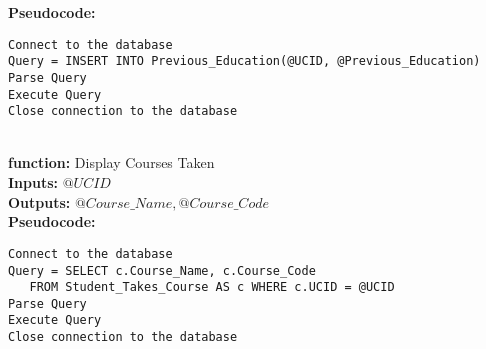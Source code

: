 \documentclass[11pt]{article} %
\begin{document}
\textbf{Pseudocode:} 
\begin{verbatim}
Connect to the database
Query = INSERT INTO Previous_Education(@UCID, @Previous_Education)
Parse Query
Execute Query
Close connection to the database
\end{verbatim} \\
\textbf{function:} Display Courses Taken\\
\textbf{Inputs:} $@UCID$\\
\textbf{Outputs:} $@Course\_Name, @Course\_Code$\\
\textbf{Pseudocode:} 
\begin{verbatim}
Connect to the database
Query = SELECT c.Course_Name, c.Course_Code 
   FROM Student_Takes_Course AS c WHERE c.UCID = @UCID
Parse Query
Execute Query
Close connection to the database
\end{verbatim} \\
\end{document}
